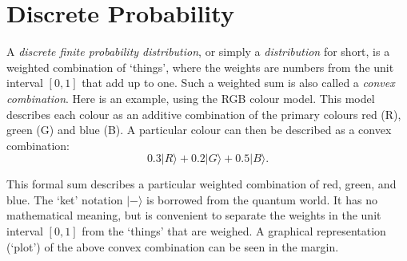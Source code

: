 \documentclass[leqno]{tufte-book} %
\newcommand{\ket}[1]{\ensuremath{|#1\rangle}}
\begin{document}

\mainmatter


\chapter{Discrete Probability}\label{ch:dp}

A \emph{discrete finite probability distribution},
or simply a \emph{distribution} for short, is a weighted combination
of `things', where the weights are numbers from the unit interval
$[0,1]$ that add up to one. Such a weighted sum is also called a
\emph{convex combination}. Here is an
example, using the RGB colour model.  This model describes each colour
as an additive combination of the primary colours red (R), green (G)
and blue (B). A particular colour can then be described as a convex
combination:
$$0.3\ket{R} + 0.2\ket{G} + 0.5\ket{B}.$$

\noindent This formal sum describes a particular weighted combination
of red, green, and blue. The `ket' notation $\ket{-}$ is borrowed from
the quantum world. It has no mathematical meaning, but is convenient
to separate the weights in the unit interval $[0,1]$ from the `things'
that are weighed. A graphical representation (`plot') of the above
convex combination can be seen in the
margin.
\end{document}

